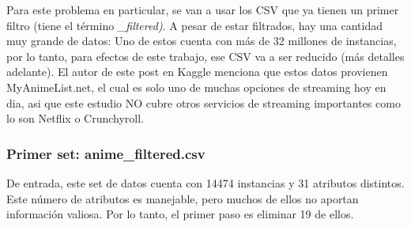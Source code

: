 \documentclass[a4paper]{article}
\begin{document}
Para este problema en particular, se van a usar los CSV que ya tienen un primer filtro (tiene el término \textit{\_filtered)}. A pesar de estar filtrados, hay una cantidad muy grande de datos: Uno de estos cuenta con más de 32 millones de instancias, por lo tanto, para efectos de este trabajo, ese CSV va a ser reducido (más detalles adelante). El autor de este post en Kaggle menciona que estos datos provienen MyAnimeList.net, el cual es solo uno de muchas opciones de streaming hoy en dia, asi que este estudio NO cubre otros servicios de streaming importantes como lo son Netflix o Crunchyroll.

\subsubsection{Primer set: anime\_filtered.csv}
De entrada, este set de datos cuenta con 14474 instancias y 31 atributos distintos. Este número de atributos es manejable, pero muchos de ellos no aportan información valiosa. Por lo tanto, el primer paso es eliminar 19 de ellos.
\end{document}
